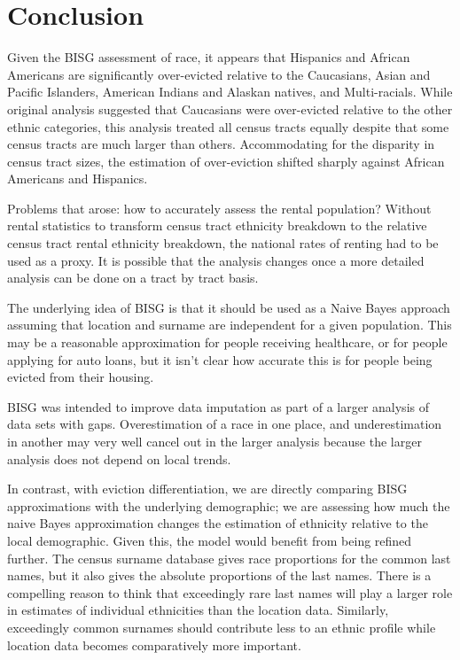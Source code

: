 
\chapter{Conclusion}
\label{chap:conclusion}
\par Given the BISG assessment of race, it appears that Hispanics and African Americans are significantly over-evicted relative to the Caucasians, Asian and Pacific Islanders, American Indians and Alaskan natives, and Multi-racials.  While original analysis suggested that Caucasians were over-evicted relative to the other ethnic categories, this analysis treated all census tracts equally despite that some census tracts are much larger than others.  Accommodating for the disparity in census tract sizes, the estimation of over-eviction shifted sharply against African Americans and Hispanics.

\par Problems that arose: how to accurately assess the rental population?  Without rental statistics to transform census tract ethnicity breakdown to the relative census tract rental ethnicity breakdown, the national rates of renting had to be used as a proxy.  It is possible that the analysis changes once a more detailed analysis can be done on a tract by tract basis.  

\par The underlying idea of BISG is that it should be used as a Naive Bayes approach assuming that location and surname are independent for a given population.  This may be a reasonable approximation for people receiving healthcare, or for people applying for auto loans, but it isn’t clear how accurate this is for people being evicted from their housing.

\par BISG was intended to improve data imputation as part of a larger analysis of data sets with gaps.  Overestimation of a race in one place, and underestimation in another may very well cancel out in the larger analysis because the larger analysis does not depend on local trends.

\par In contrast, with eviction differentiation, we are directly comparing BISG approximations with the underlying demographic; we are assessing how much the naive Bayes approximation changes the estimation of ethnicity relative to the local demographic.  Given this, the model would benefit from being refined further.  The census surname database gives race proportions for the common last names, but it also gives the absolute proportions of the last names.  There is a compelling reason to think that exceedingly rare last names will play a larger role in estimates of individual ethnicities than the location data.  Similarly, exceedingly common surnames should contribute less to an ethnic profile while location data becomes comparatively more important.  

